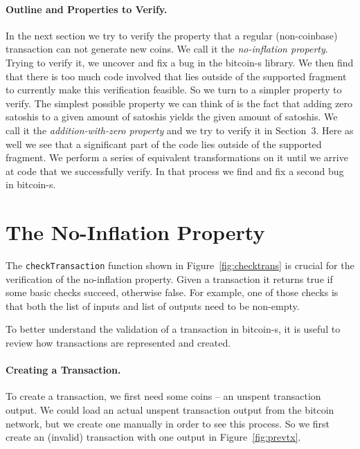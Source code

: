 \documentclass[hyphens, a4paper,USenglish,cleveref, autoref, thm-restate]{oasics-v2019}
\begin{document}
\paragraph{Outline and Properties to Verify.} In the next section we
try to verify the property that a regular (non-coinbase) transaction
can not generate new coins. We call it the \emph{no-inflation
  property}. Trying to verify it, we uncover and fix a bug in the
bitcoin-s library. We then find that there is too much code involved
that lies outside of the supported fragment to currently make this
verification feasible. So we turn to a simpler property to verify. The
simplest possible property we can think of is the fact that adding
zero satoshis to a given amount of satoshis yields the given amount of
satoshis. We call it the \emph{addition-with-zero property} and we try
to verify it in Section~3. Here as well we see that a significant part
of the code lies outside of the supported fragment. We perform a
  series of equivalent transformations on it until we arrive at code that we
  successfully verify. In that process we find and fix a second bug in
  bitcoin-s.


\section{The No-Inflation Property}


The \texttt{checkTransaction} function shown in
Figure~\ref{fig:checktrans} is crucial for the verification of the
no-inflation property. Given a transaction it returns true if some
basic checks succeed, otherwise false. For example, one of those
checks is that both the list of inputs and list of outputs need to be
non-empty.

To better understand the validation of a transaction in bitcoin-s, it
is useful to review how transactions are represented and created.

\paragraph{Creating a Transaction.} To create a transaction, we first
need some coins -- an unspent transaction output. We could load an
actual unspent transaction output from the bitcoin network, but we
create one manually in order to see this process. So we first create
an (invalid) transaction with one output in Figure~\ref{fig:prevtx}.
\end{document}
